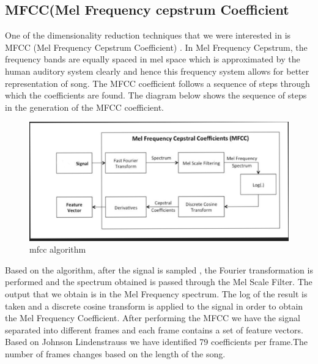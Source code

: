 \documentclass[12pt]{article}
\begin{document}
\subsection{MFCC(Mel Frequency cepstrum Coefficient }
One of the dimensionality reduction techniques that we were interested in is MFCC (Mel Frequency Cepstrum Coefficient) \cite{logmfcc}. In Mel Frequency Cepstrum, the frequency bands are equally spaced in mel space which is approximated by the human auditory system clearly and hence this frequency system allows for better representation of song.
The MFCC coefficient follows a sequence of steps through which the coefficients are found.
The diagram below shows the sequence of steps in the generation of the MFCC coefficient.
\begin{figure}[H]
\center
\includegraphics [scale=0.5]{mfcc.png}
\caption{mfcc algorithm}
\end{figure}
Based on the algorithm, after the signal is sampled ,  the Fourier transformation is performed and the spectrum obtained is passed through the Mel Scale Filter. The output that we obtain is in the Mel Frequency spectrum.
The log of the result is taken and a discrete cosine transform is applied to the signal in order to obtain the Mel Frequency Coefficient.
After performing the MFCC we have the signal separated into different frames and each frame contains a set of feature vectors. Based on Johnson Lindenstrauss we have identified 79 coefficients per frame.The number of frames changes based on the length of the song.
\end{document}

